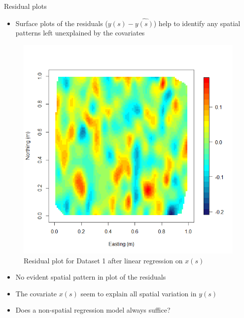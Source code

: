 \documentclass[xcolor=pdftex,dvipsnames,table,numbers,hyperref={pdfpagelabels=false},compress]{beamer}
\newcommand{\red}[1]{{\color{Red} #1}}
\begin{document}
\begin{frame}{Residual plots}
	\begin{itemize}
		\item Surface plots of the residuals ($y(s) - \widehat{y(s)}$) help to identify any spatial patterns left unexplained by the covariates 
	\end{itemize}
	\begin{figure}
		\includegraphics[scale=0.15,trim={2mm 5mm 2mm  5mm},clip]{figures/data1_res.png}
		\caption{Residual plot for Dataset 1 after linear regression on $x(s)$}
	\end{figure}
	\pause
	\vskip -5mm \begin{itemize}
		\item No evident spatial pattern in plot of the residuals
		\item The covariate $x(s)$ seem to explain all spatial variation in $y(s)$
		\item \red{Does a non-spatial regression model always suffice?}
	\end{itemize}
\end{frame}
\end{document}

